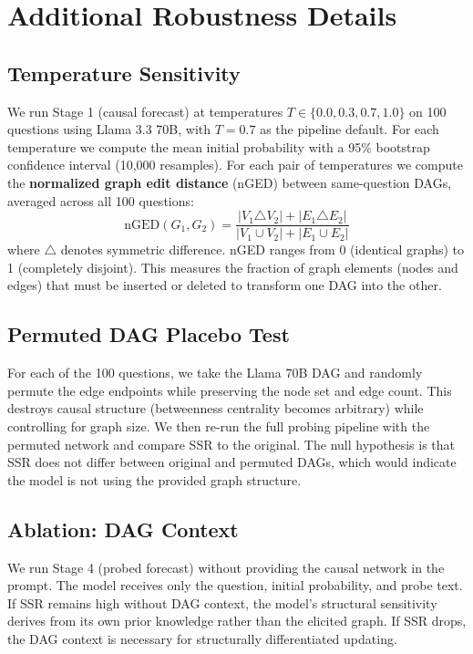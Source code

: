 \documentclass[11pt]{article}
\begin{document}
\section{Additional Robustness Details}
\label{app:robustness}

\subsection{Temperature Sensitivity}

We run Stage 1 (causal forecast) at temperatures $T \in \{0.0, 0.3, 0.7, 1.0\}$ on 100 questions using Llama 3.3 70B, with $T = 0.7$ as the pipeline default. For each temperature we compute the mean initial probability with a 95\% bootstrap confidence interval (10,000 resamples). For each pair of temperatures we compute the \textbf{normalized graph edit distance} (nGED) between same-question DAGs, averaged across all 100 questions:
\begin{equation}
    \text{nGED}(G_1, G_2) = \frac{|V_1 \triangle V_2| + |E_1 \triangle E_2|}{|V_1 \cup V_2| + |E_1 \cup E_2|}
\end{equation}
where $\triangle$ denotes symmetric difference. nGED ranges from 0 (identical graphs) to 1 (completely disjoint). This measures the fraction of graph elements (nodes and edges) that must be inserted or deleted to transform one DAG into the other.

\subsection{Permuted DAG Placebo Test}

For each of the 100 questions, we take the Llama 70B DAG and randomly permute the edge endpoints while preserving the node set and edge count. This destroys causal structure (betweenness centrality becomes arbitrary) while controlling for graph size. We then re-run the full probing pipeline with the permuted network and compare SSR to the original. The null hypothesis is that SSR does not differ between original and permuted DAGs, which would indicate the model is not using the provided graph structure.

\subsection{Ablation: DAG Context}

We run Stage 4 (probed forecast) without providing the causal network in the prompt. The model receives only the question, initial probability, and probe text. If SSR remains high without DAG context, the model's structural sensitivity derives from its own prior knowledge rather than the elicited graph. If SSR drops, the DAG context is necessary for structurally differentiated updating.
\end{document}
